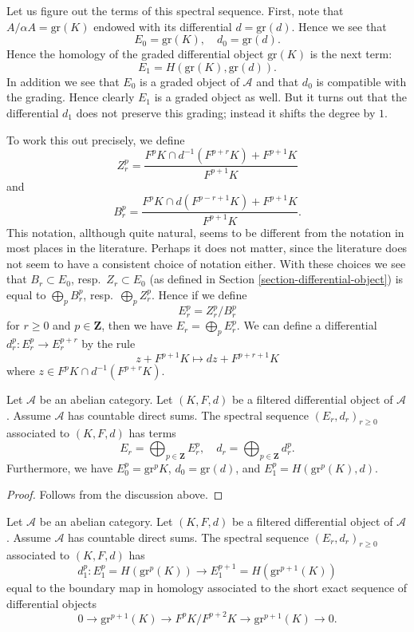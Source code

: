 \medskip\noindent
Let us figure out the terms of this spectral sequence.
First, note that $A/\alpha A = \text{gr}(K)$
endowed with its differential $d = \text{gr}(d)$. Hence we see that
$$
E_0 = \text{gr}(K), \quad d_0 = \text{gr}(d).
$$
Hence the homology of the graded differential object $\text{gr}(K)$
is the next term:
$$
E_1 = H(\text{gr}(K), \text{gr}(d)).
$$
In addition we see that $E_0$ is a graded object of $\mathcal{A}$
and that $d_0$ is compatible with the grading. Hence clearly $E_1$
is a graded object as well. But it turns out that the differential
$d_1$ does not preserve this grading; instead it shifts the degree by $1$.

\medskip\noindent
To work this out precisely, we define
$$
Z_r^p =
\frac{F^pK \cap d^{-1}(F^{p + r}K) + F^{p + 1}K}{F^{p + 1}K}
$$
and
$$
B_r^p =
\frac{F^pK \cap d(F^{p - r + 1}K) + F^{p + 1}K}{F^{p + 1}K}.
$$
This notation, allthough quite natural, seems to be different from the
notation in most places in the literature. Perhaps it does not matter,
since the literature does not seem to have a consistent choice of notation
either. With these choices we see that $B_r \subset E_0$,
resp.\ $Z_r \subset E_0$ (as defined in
Section \ref{section-differential-object}) is equal to
$\bigoplus_p B_r^p$, resp.\ $\bigoplus_p Z_r^p$.
Hence if we define
$$
E_r^p = Z_r^p/B_r^p
$$
for $r \geq 0$ and $p \in \mathbf{Z}$, then we have $E_r = \bigoplus_p E_r^p$.
We can define a differential $d_r^p : E_r^p \to E_r^{p + r}$
by the rule
$$
z + F^{p + 1}K
\longmapsto
dz + F^{p + r + 1}K
$$
where $z \in F^pK \cap d^{-1}(F^{p + r}K)$.

\begin{lemma}
\label{lemma-spectral-sequence-filtered-differential}
Let $\mathcal{A}$ be an abelian category.
Let $(K, F, d)$ be a filtered differential object of $\mathcal{A}$.
Assume $\mathcal{A}$ has countable direct sums.
The spectral sequence $(E_r, d_r)_{r \geq 0}$
associated to $(K, F, d)$ has terms
$$
E_r = \bigoplus\nolimits_{p \in \mathbf{Z}} E_r^p,
\quad
d_r = \bigoplus\nolimits_{p \in \mathbf{Z}} d_r^p.
$$
Furthermore, we have
$E_0^p = \text{gr}^p K$, $d_0 = \text{gr}(d)$,
and $E_1^p = H(\text{gr}^p(K), d)$.
\end{lemma}

\begin{proof}
Follows from the discussion above.
\end{proof}

\begin{lemma}
\label{lemma-spectral-sequence-filtered-differential-d1}
Let $\mathcal{A}$ be an abelian category.
Let $(K, F, d)$ be a filtered differential object of $\mathcal{A}$.
Assume $\mathcal{A}$ has countable direct sums.
The spectral sequence $(E_r, d_r)_{r \geq 0}$
associated to $(K, F, d)$ has
$$
d_1^p :
E_1^p = H(\text{gr}^p(K))
\longrightarrow
E_1^{p + 1} = H(\text{gr}^{p + 1}(K))
$$
equal to the boundary map in homology associated to the short
exact sequence of differential objects
$$
0 \to \text{gr}^{p + 1}(K) \to F^pK/F^{p + 2}K \to \text{gr}^{p + 1}(K) \to 0.
$$
\end{lemma}


